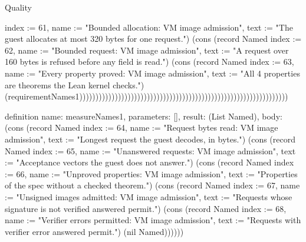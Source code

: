 \begin{lexlean}{Quality}
\begin{semanticmodule}
{{index := 61, name := "Bounded allocation: VM image admission", text := "The guest allocates at most 320 bytes for one request."}) (cons (record Named {index := 62, name := "Bounded request: VM image admission", text := "A request over 160 bytes is refused before any field is read."}) (cons (record Named {index := 63, name := "Every property proved: VM image admission", text := "All 4 properties are theorems the Lean kernel checks."}) (requirementNames1)))))))))))))))))))))))))))))))))))))))))))))))))))))))))))))))))
}

definition{
  name: measureNames1,
  parameters: [],
  result: (List Named),
  body: (cons (record Named {index := 64, name := "Request bytes read: VM image admission", text := "Longest request the guest decodes, in bytes."}) (cons (record Named {index := 65, name := "Unanswered requests: VM image admission", text := "Acceptance vectors the guest does not answer."}) (cons (record Named {index := 66, name := "Unproved properties: VM image admission", text := "Properties of the spec without a checked theorem."}) (cons (record Named {index := 67, name := "Unsigned images admitted: VM image admission", text := "Requests whose signature is not verified answered permit."}) (cons (record Named {index := 68, name := "Verifier errors permitted: VM image admission", text := "Requests with verifier error answered permit."}) (nil Named))))))
}


\end{semanticmodule}
\end{lexlean}
